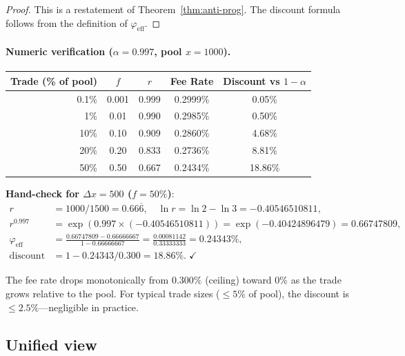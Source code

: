 \documentclass[11pt]{article}
\theoremstyle{definition}
\theoremstyle{remark}
\newcommand{\dx}{\Delta x}
\begin{document}
\begin{proof}
This is a restatement of Theorem~\ref{thm:anti-prog}.
The discount formula follows from the definition of $\varphi_{\mathrm{eff}}$.
\end{proof}

\paragraph{Numeric verification ($\alpha=0.997$, pool $x=1000$).}
\begin{center}
\begin{tabular}{@{}rcccc@{}}
\toprule
\textbf{Trade (\% of pool)} & $f$ & $r$ & \textbf{Fee Rate} & \textbf{Discount vs $1{-}\alpha$} \\
\midrule
0.1\% & 0.001 & 0.999 & 0.2999\% & 0.05\% \\
1\% & 0.01 & 0.990 & 0.2985\% & 0.50\% \\
10\% & 0.10 & 0.909 & 0.2860\% & 4.68\% \\
20\% & 0.20 & 0.833 & 0.2736\% & 8.81\% \\
50\% & 0.50 & 0.667 & 0.2434\% & 18.86\% \\
\bottomrule
\end{tabular}
\end{center}

\noindent
\textbf{Hand-check for $\dx=500$ ($f=50\%$)}:
\begin{align*}
r &= 1000/1500 = 0.66\overline{6},\quad
\ln r = \ln 2 - \ln 3 = -0.40546510811,\\
r^{0.997} &= \exp(0.997\times(-0.40546510811)) = \exp(-0.40424896479) = 0.66747809,\\
\varphi_{\mathrm{eff}} &= \frac{0.66747809-0.66666667}{1-0.66666667} = \frac{0.00081142}{0.33333333} = 0.24343\%,\\
\mathrm{discount} &= 1 - 0.24343/0.300 = 18.86\%.\;\checkmark
\end{align*}

The fee rate drops monotonically from $0.300\%$ (ceiling) toward $0\%$ as the trade grows relative to the pool.
For typical trade sizes (${\le}5\%$ of pool), the discount is ${\le}2.5\%$---negligible in practice.

\subsection{Unified view}
\end{document}
